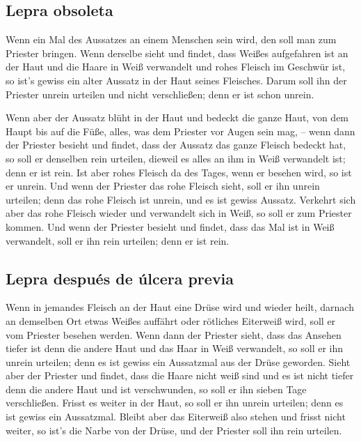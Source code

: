 \hypertarget{lepra-obsoleta}{%
\subsection{Lepra obsoleta}\label{lepra-obsoleta}}

 Wenn ein Mal des Aussatzes an einem Menschen sein wird,
den soll man zum Priester bringen.  Wenn derselbe sieht
und findet, dass Weißes aufgefahren ist an der Haut und die Haare in
Weiß verwandelt und rohes Fleisch im Geschwür ist,  so
ist's gewiss ein alter Aussatz in der Haut seines Fleisches. Darum soll
ihn der Priester unrein urteilen und nicht verschließen; denn er ist
schon unrein.

 Wenn aber der Aussatz blüht in der Haut und bedeckt die
ganze Haut, von dem Haupt bis auf die Füße, alles, was dem Priester vor
Augen sein mag, --  wenn dann der Priester besieht und
findet, dass der Aussatz das ganze Fleisch bedeckt hat, so soll er
denselben rein urteilen, dieweil es alles an ihm in Weiß verwandelt ist;
denn er ist rein.  Ist aber rohes Fleisch da des Tages,
wenn er besehen wird, so ist er unrein.  Und wenn der
Priester das rohe Fleisch sieht, soll er ihn unrein urteilen; denn das
rohe Fleisch ist unrein, und es ist gewiss Aussatz. 
Verkehrt sich aber das rohe Fleisch wieder und verwandelt sich in Weiß,
so soll er zum Priester kommen.  Und wenn der Priester
besieht und findet, dass das Mal ist in Weiß verwandelt, soll er ihn
rein urteilen; denn er ist rein.

\hypertarget{lepra-despuuxe9s-de-uxfalcera-previa}{%
\subsection{Lepra después de úlcera
previa}\label{lepra-despuuxe9s-de-uxfalcera-previa}}

 Wenn in jemandes Fleisch an der Haut eine Drüse wird und
wieder heilt,  darnach an demselben Ort etwas Weißes
auffährt oder rötliches Eiterweiß wird, soll er vom Priester besehen
werden.  Wenn dann der Priester sieht, dass das Ansehen
tiefer ist denn die andere Haut und das Haar in Weiß verwandelt, so soll
er ihn unrein urteilen; denn es ist gewiss ein Aussatzmal aus der Drüse
geworden.  Sieht aber der Priester und findet, dass die
Haare nicht weiß sind und es ist nicht tiefer denn die andere Haut und
ist verschwunden, so soll er ihn sieben Tage verschließen.
 Frisst es weiter in der Haut, so soll er ihn unrein
urteilen; denn es ist gewiss ein Aussatzmal.  Bleibt aber
das Eiterweiß also stehen und frisst nicht weiter, so ist's die Narbe
von der Drüse, und der Priester soll ihn rein urteilen.

